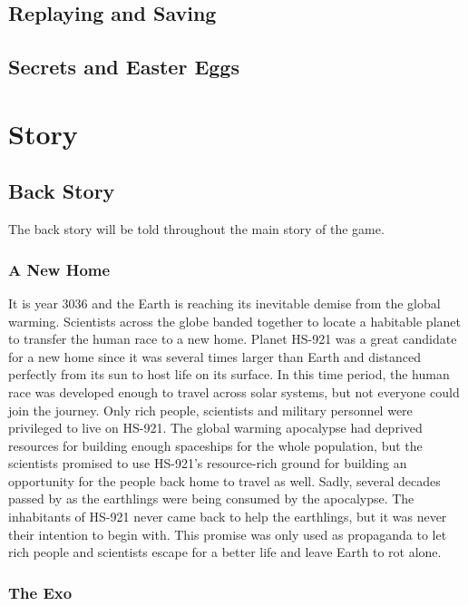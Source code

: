\documentclass[12pt]{article}
\begin{document}
\subsection{Replaying and Saving}

\subsection{Secrets and Easter Eggs}

\section{Story}

\subsection{Back Story}

The back story will be told throughout the main story of the game. 

\subsubsection{A New Home}

It is year 3036 and the Earth is reaching its inevitable demise from the global warming. Scientists across the globe banded together to locate a habitable planet to transfer the human race to a new home. Planet HS-921 was a great candidate for a new home since it was several times larger than Earth and distanced perfectly from its sun to host life on its surface. In this time period, the human race was  developed enough to travel across solar systems, but not everyone could join the journey. Only rich people, scientists and military personnel were privileged to live on HS-921. The global warming apocalypse had deprived resources for building enough spaceships for the whole population, but the scientists promised to use HS-921's resource-rich ground for building an opportunity for the people back home to travel as well. Sadly, several decades passed by as the earthlings were being consumed by the apocalypse. The inhabitants of HS-921 never came back to help the earthlings, but it was never their intention to begin with. This promise was only used as propaganda to let rich people and scientists escape for a better life and leave Earth to rot alone. 

\subsubsection{The Exo}
\end{document}
